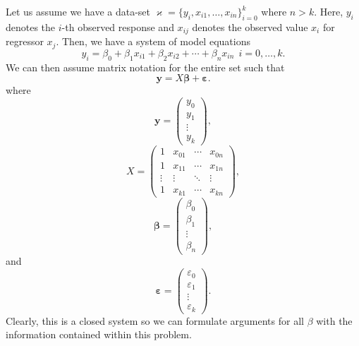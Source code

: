 \documentclass[10pt,a4paper, twocolumn, conference]{IEEEtran}
\theoremstyle{own}
\theoremstyle{definition}
\theoremstyle{plain}
\begin{document}
Let us assume we have a data-set $\varkappa = \{y_i, x_{i1}, \ldots, x_{in} \}_{i=0}^k$ where $n > k$. Here, $y_i$ denotes the $i$-th observed response and $x_{ij}$ denotes the observed value $x_i$ for regressor $x_j$. Then, we have a system of model equations
\begin{equation}
y_i = \beta_0 + \beta_1 x_{i1} + \beta_2 x_{i2} + \cdots + \beta_n x_{in} ~~ i = 0, \ldots, k.
\end{equation}
We can then assume matrix notation for the entire set such that
\begin{equation}
\mathbf{y} = X \boldsymbol\beta + \boldsymbol\varepsilon.
\end{equation}
where
\begin{equation}
\mathbf{y} = \left( \begin{matrix} y_0 \\ y_1 \\ \vdots \\ y_k \end{matrix} \right),
\end{equation}
\begin{equation}
X = \left( \begin{matrix}
1 & x_{01} & \cdots & x_{0n} \\
1 & x_{11} & \cdots & x_{1n} \\
\vdots & \vdots & \ddots & \vdots \\
1 & x_{k1} & \cdots & x_{kn} 
\end{matrix} \right),
\end{equation}
\begin{equation}
\boldsymbol\beta = \left( \begin{matrix} \beta_0 \\ \beta_1 \\ \vdots \\ \beta_n \end{matrix} \right),
\end{equation}
and
\begin{equation}
\boldsymbol\varepsilon = \left( \begin{matrix} \varepsilon_0 \\ \varepsilon_1 \\ \vdots \\ \varepsilon_k \end{matrix} \right).
\end{equation}
Clearly, this is a closed system so we can formulate arguments for all $\beta$ with the information contained within this problem.


















 
\end{document}
